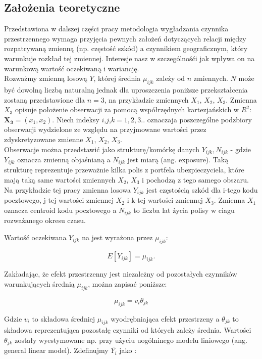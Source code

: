 \documentclass[polish, twoside, 12pt, a4paper]{article}
\theoremstyle{definition}
\theoremstyle{plain}
\theoremstyle{remark}
\begin{document}
\subsection{Założenia teoretyczne}
Przedstawiona w dalszej części pracy metodologia wygładzania czynnika przestrzennego wymaga przyjęcia pewnych założeń dotyczących relacji między rozpatrywaną zmienną (np. częstość szkód) a czynnikiem geograficznym, który warunkuje rozkład tej zmiennej. Interesje nasz w szczególnośći jak wpływa on na warunkową wartość oczekiwaną i wariancję.\\

 
Rozważmy zmienną losową \(Y\), której średnia \(\mu_{ijk}\) zależy od \(n\) zmiennych. \(N\) może być dowolną liczbą naturalną jednak dla uproszczenia poniższe przekształcenia zostaną przedstawione dla \(n=3\),  na przykładzie zmiennych \(X_1\), \(X_2\), \(X_3\). Zmienna \(X_3\) opisuje położenie obserwacji za pomocą współrzędnych kartezjańskich w \(R^2:\)  \(\boldsymbol{X_3}=(x_1,x_2)\).
Niech indeksy \(i\),\(j\),\(k= 1,2,3..\)  oznaczaja poszczególne podzbiory obserwacji wydzielone ze względu na  przyjmowane wartości  przez zdyskretyzowane zmienne \(X_1\), \(X_2\), \(X_3\). \\
Obserwacje można przedstawić jako strukturę/komórkę danych \({Y_{ijk}, N_{ijk}}\) - gdzie \(Y_{ijk}\) oznacza  zmienną objaśnianą a  \(N_{ijk}\) jest miarą (ang. exposure). Taką strukturę reprezentuje przeważnie kilka polis z portfela ubezpieczyciela, które mają taką same wartości zmiennych $X_2$, $X_3$ i pochodzą z tego samego obszaru.\\



Na przykładzie tej pracy zmienna losowa $Y_{ijk}$ jest częstością szkód dla i-tego kodu pocztowego, j-tej wartości zmiennej $X_2$ i k-tej wartości zmiennej $X_3$. Zmienna $X_1$ oznacza centroid kodu pocztowego a $N_{ijk}$ to liczba lat życia polisy w ciagu rozważanego okresu czasu.   

Wartość oczekiwana $Y_{ijk}$ na jest wyrażona przez $\mu_{ijk}$:

\[
E[Y_{ijk}]=\mu_{ijk}.
\]

Zakładając, że efekt przestrzenny jest niezależny od pozostałych czynników warunkujących średnią \(\mu_{ijk}\), można zapisać poniższe:

\[
\mu_{ijk}=v_i \theta_{jk}
\]

Gdzie \(v_i\)  to składowa średniej  \(\mu_{ijk}\) wyodrębniająca efekt przestrzeny a \(\theta_{jk}\) to składowa reprezentująca pozostałę czynniki od których zależy średnia. Wartości \(\theta_{jk}\) zostały wyestymowane np. przy użyciu uogólninego modelu liniowego (ang. general linear model). Zdefinujmy $\bar{Y_i}$ jako :
\end{document}
